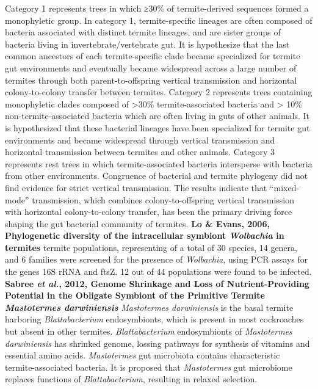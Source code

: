 \documentclass[11pt]{article}
\begin{document}
\begin{sloppypar}
Category 1 represents trees in which ≥30\% of termite-derived sequences formed a monophyletic group. 
In category 1, termite-specific lineages are often composed of bacteria associated with distinct termite lineages, and are sister groups of bacteria living in invertebrate/vertebrate gut. 
It is hypothesize that the last common ancestors of each termite-specific clade became specialized for termite gut environments and eventually became widespread across a large number of termites through both parent-to-offspring vertical transmission and horizontal colony-to-colony transfer between termites. 
Category 2 represents trees containing monophyletic clades composed of >30\% termite-associated bacteria and > 10\% non-termite-associated bacteria which are often living in guts of other animals. 
It is hypothesized that these bacterial lineages have been specialized for termite gut environments and became widespread through vertical transmission and horizontal transmission between termites and other animals. 
Category 3 represents rest trees in which termite-associated bacteria intersperse with bacteria from other environments. 
Congruence of bacterial and termite phylogeny did not find evidence for strict vertical transmission. 
The results indicate that “mixed-mode” transmission, which combines colony-to-offspring vertical transmission with horizontal colony-to-colony transfer, has been the primary driving force shaping the gut bacterial community of termites.
\textbf{Lo & Evans, 2006, Phylogenetic diversity of the intracellular symbiont \textit{Wolbachia} in termites}   termite populations, representing of a total of 30 species, 14 genera, and 6 families were screened for the presence of \textit{Wolbachia}, using PCR assays for the genes 16S rRNA and ftsZ. 
12 out of 44 populations were found to be infected. 
\textbf{Sabree \textit{et al.}, 2012, Genome Shrinkage and Loss of Nutrient-Providing Potential in the Obligate Symbiont of the Primitive Termite \textit{Mastotermes darwiniensis}} \newline
\textit{Mastotermes darwiniensis} is the basal termite harboring \textit{Blattabacterium} endosymbionts, which is present in most cockroaches but absent in other termites. 
\textit{Blattabacterium} endosymbionts of \textit{Mastotermes darwiniensis} has shrinked genome, lossing pathways for synthesis of vitamins and essential amino acids. 
\textit{Mastotermes} gut microbiota contains characteristic termite-associated bacteria.
It is proposed that \textit{Mastotermes} gut microbiome replaces functions of \textit{Blattabacterium}, resulting in relaxed selection.

\end{sloppypar}
\end{document}
